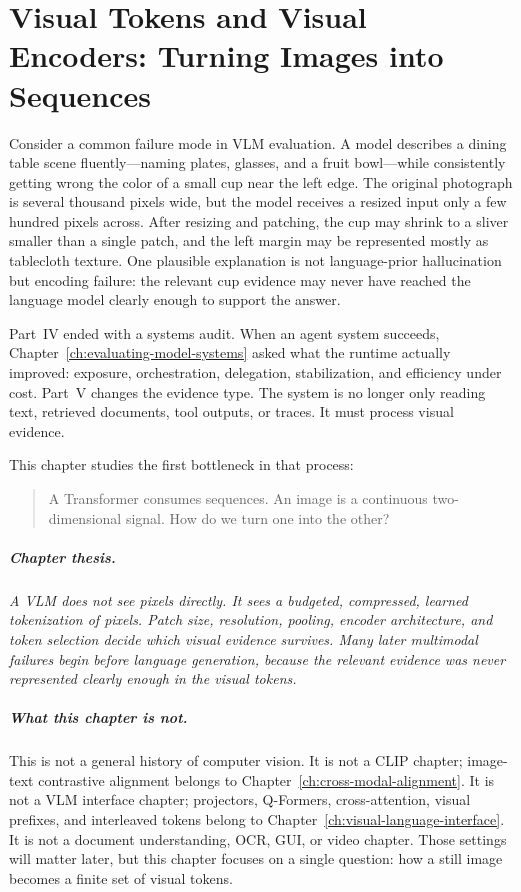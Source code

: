 \chapter[Visual Tokens and Visual Encoders]{Visual Tokens and Visual Encoders: Turning Images into Sequences}
\label{ch:visual-tokens-encoders}
\raggedbottom

Consider a common failure mode in VLM evaluation. A model describes a dining table scene fluently---naming plates, glasses, and a fruit bowl---while consistently getting wrong the color of a small cup near the left edge. The original photograph is several thousand pixels wide, but the model receives a resized input only a few hundred pixels across. After resizing and patching, the cup may shrink to a sliver smaller than a single patch, and the left margin may be represented mostly as tablecloth texture. One plausible explanation is not language-prior hallucination but encoding failure: the relevant cup evidence may never have reached the language model clearly enough to support the answer.

Part~IV ended with a systems audit. When an agent system succeeds, Chapter~\ref{ch:evaluating-model-systems} asked what the runtime actually improved: exposure, orchestration, delegation, stabilization, and efficiency under cost. Part~V changes the evidence type. The system is no longer only reading text, retrieved documents, tool outputs, or traces. It must process visual evidence.

This chapter studies the first bottleneck in that process:

\begin{quote}
A Transformer consumes sequences. An image is a continuous two-dimensional signal. How do we turn one into the other?
\end{quote}

\paragraph{Chapter thesis.} \emph{A VLM does not see pixels directly. It sees a budgeted, compressed, learned tokenization of pixels. Patch size, resolution, pooling, encoder architecture, and token selection decide which visual evidence survives. Many later multimodal failures begin before language generation, because the relevant evidence was never represented clearly enough in the visual tokens.}

\paragraph{What this chapter is not.} This is not a general history of computer vision. It is not a CLIP chapter; image-text contrastive alignment belongs to Chapter~\ref{ch:cross-modal-alignment}. It is not a VLM interface chapter; projectors, Q-Formers, cross-attention, visual prefixes, and interleaved tokens belong to Chapter~\ref{ch:visual-language-interface}. It is not a document understanding, OCR, GUI, or video chapter. Those settings will matter later, but this chapter focuses on a single question: how a still image becomes a finite set of visual tokens.


